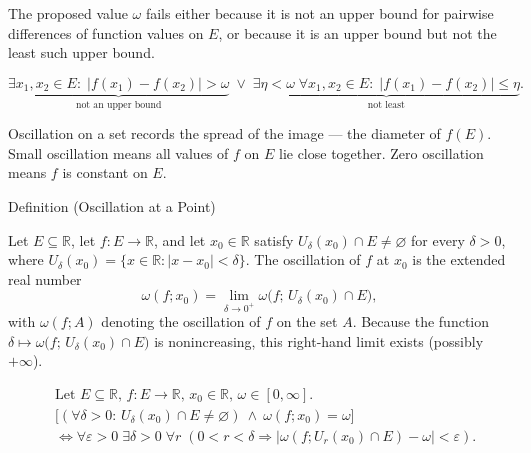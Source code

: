 \begin{remark*}
The proposed value $\omega$ fails either because it is not an upper
bound for pairwise differences of function values on $E$, or because it
is an upper bound but not the least such upper bound.
\end{remark*}

\begin{remark*}
\[
\underbrace{\exists x_1,x_2\in E:\; |f(x_1)-f(x_2)|>\omega}_{\text{not an upper bound}}
\;\lor\;
\underbrace{\exists \eta<\omega\; \forall x_1,x_2\in E:\; |f(x_1)-f(x_2)|\le \eta}_{\text{not least}}.
\]
\end{remark*}

\begin{remark*}[Interpretation]
Oscillation on a set records the spread of the image --- the diameter
of $f(E)$. Small oscillation means all values of $f$ on $E$ lie
close together. Zero oscillation means $f$ is constant on $E$.
\end{remark*}

\NoLocalDependencies

\begin{definitionbox}{Definition (Oscillation at a Point)}
\begin{definition}
\label{def:oscillation-at-a-point}
Let $E \subseteq \mathbb{R}$, let $f:E \to \mathbb{R}$, and let $x_0 \in \mathbb{R}$ satisfy $U_\delta(x_0)\cap E \neq \varnothing$ for every $\delta>0$, where $U_\delta(x_0)=\{x \in \mathbb{R}: |x-x_0|<\delta\}$. The oscillation of $f$ at $x_0$ is the extended real number
\[
\omega(f;x_0)
=
\lim_{\delta \to 0^+}
\omega\bigl(f;\,U_\delta(x_0)\cap E\bigr),
\]
with $\omega(f;A)$ denoting the oscillation of $f$ on the set $A$. Because the function $\delta \mapsto \omega\bigl(f;\,U_\delta(x_0)\cap E\bigr)$ is nonincreasing, this right-hand limit exists (possibly $+\infty$).
\end{definition}
\end{definitionbox}

\begin{remark*}
\[
\begin{aligned}
&\text{Let } E \subseteq \mathbb{R},\, f:E \to \mathbb{R},\, x_0 \in \mathbb{R},\, \omega \in [0,\infty].\\
&\bigl[(\forall \delta>0:\, U_\delta(x_0)\cap E \neq \varnothing)\ \land\ \omega(f;x_0)=\omega\bigr]\\
&\Longleftrightarrow
\forall \varepsilon>0\; \exists \delta>0\; \forall r\;(0<r<\delta \Rightarrow |\omega(f;U_r(x_0)\cap E)-\omega|<\varepsilon).
\end{aligned}
\]
\end{remark*}

